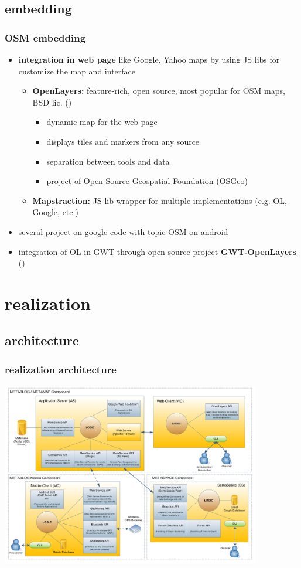 \documentclass[blue]{beamer}
\begin{document}
\subsection{embedding}
\frame
{
\frametitle{\textbf{OSM embedding}}
\begin{itemize}
	\item \textbf{integration in web page} like Google, Yahoo maps by using JS libs for customize the map and interface
	\begin{itemize}
		\item \textbf{OpenLayers:} feature-rich, open source, most popular for OSM maps, BSD lic. ()
		\begin{itemize}
			\item dynamic map for the web page
			\item displays tiles and markers from any source
			\item separation between tools and data
			\item project of Open Source Geospatial Foundation (OSGeo)
		\end{itemize}
		\item \textbf{Mapstraction:} JS lib wrapper for multiple implementations (e.g. OL, Google, etc.)
	\end{itemize}
	\item several project on google code with topic OSM on android
	\item integration of OL in GWT through open source project \textbf{GWT-OpenLayers} ()
\end{itemize}
}




\section{realization}
\subsection{architecture}
\frame
{
\frametitle{\textbf{realization architecture}}
\includegraphics[width=0.85\textwidth]{bin/architecture/component-diagram_update.png}
}
\end{document}
